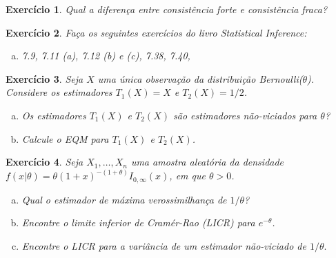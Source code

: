 \documentclass[letter,11pt]{article}
\newtheorem{exer}{Exercício}
\begin{document}
    
\begin{exer} \rm
Qual a diferença entre consistência forte e consistência fraca?
\end{exer}


\begin{exer} \rm
Faça os seguintes exercícios do livro Statistical Inference: 

\begin{enumerate}[a)]
	\item 7.9, 7.11 (a), 7.12 (b) e (c), 7.38, 7.40,  
\end{enumerate}
\end{exer}


\begin{exer} \rm
Seja $X$ uma única observação da distribuição Bernoulli($\theta$). Considere os estimadores $T_1(X)=X$ e $T_2(X)=1/2$. %
\begin{enumerate}[a)] 
\item Os estimadores $T_1(X)$ e $T_2(X)$ são estimadores não-viciados para $\theta$?

\item Calcule o EQM para $T_1(X)$ e $T_2(X)$.
\end{enumerate}

\end{exer}


\begin{exer} \rm
\item %
Seja $X_1, \ldots, X_n$ uma amostra aleatória da densidade $f(x|\theta)=\theta(1+x)^{-(1+\theta)}I_{0, \infty}(x)$, em que $\theta > 0$.

\begin{enumerate}[a)] 

\item Qual o estimador de máxima verossimilhança de $1/\theta$?

\item Encontre o limite inferior de Cramér-Rao (LICR) para $e^{-\theta}$. %

\item Encontre o LICR para a variância de um estimador não-viciado de $1/\theta.$

\end{enumerate}

\end{exer}
\end{document}
